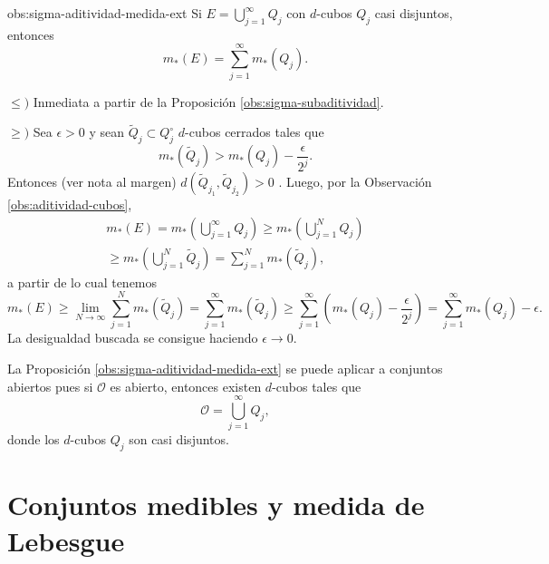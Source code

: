 \begin{proposicion}{obs:sigma-aditividad-medida-ext}
 Si $E=\bigcup\limits_{j=1}^{\infty} Q_j$ con $d$-cubos $Q_j$ casi disjuntos, entonces
\[
m_{*}(E)=\sum\limits_{j=1}^{\infty} m_{*}(Q_j).\]
\end{proposicion}


\begin{demo}
$\leq)$ Inmediata a partir de la Proposición \ref{obs:sigma-subaditividad}.

\noindent$\geq)$
Sea $\epsilon>0$ y sean $\widetilde{Q}_j\subset Q_j^{\circ}$ $d$-cubos  cerrados tales que 
\[
m_{*}(\widetilde{Q}_j)>m_{*}(Q_j )-\frac{\epsilon}{2^j}.
\]
Entonces (ver nota al margen) $d(\widetilde{Q}_{j_1},\widetilde{Q}_{j_2})>0$  .
Luego, por la Observación \ref{obs:aditividad-cubos}, 
\[
\begin{split}
m_{*}(E) =m_{*}\left(\bigcup\limits_{j=1}^{\infty} Q_j\right)
\geq m_{*}\left(\bigcup\limits_{j=1}^{N} Q_j\right)
\\
\geq m_{*}\left(\bigcup\limits_{j=1}^{N} \widetilde{Q}_j\right)
=\sum\limits_{j=1}^N m_{*}(\widetilde{Q}_j),
\end{split}
\]
a partir de lo cual tenemos
\[
m_{*}(E)\geq \lim\limits_{N\to \infty}\sum\limits_{j=1}^N  m_{*}(\widetilde{Q}_j)
=\sum\limits_{j=1}^{\infty} m_{*}(\widetilde{Q}_j)
\geq 
\sum\limits_{j=1}^{\infty} \left( m_{*}({Q}_j )-\frac{\epsilon}{2^j}\right)
=
\sum\limits_{j=1}^{\infty} m_{*}({Q}_j)-\epsilon.
\]
La desigualdad buscada se consigue haciendo $\epsilon \to 0$.
\end{demo}

 

La  Proposición \ref{obs:sigma-aditividad-medida-ext} se puede  aplicar a conjuntos abiertos pues si
$\mathcal{O}$ es abierto, entonces existen $d$-cubos tales que
\[
\mathcal{O}=\bigcup\limits_{j=1}^{\infty} Q_j,
\]
donde los $d$-cubos $Q_j$ son casi disjuntos.




\section{Conjuntos medibles y medida de Lebesgue}

